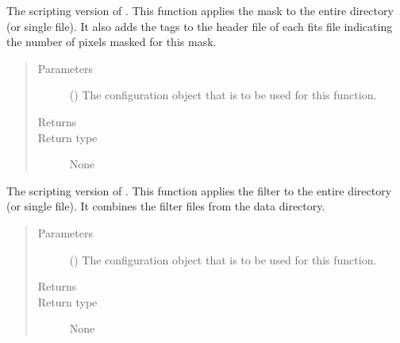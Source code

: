 \documentclass[letterpaper,10pt,english]{sphinxmanual}
\begin{document}
\begin{fulllineitems}
\label{\detokenize{docstrings/ifa_smeargle.masking.scripting:ifa_smeargle.masking.scripting.script_mask_subarray}}
The scripting version of . This function
applies the mask to the entire directory (or single file). It
also adds the tags to the header file of each fits file
indicating the number of pixels masked for this mask.
\begin{quote}\begin{description}
\item[{Parameters}] \leavevmode
{} () \textendash{} The configuration object that is to be used for this
function.

\item[{Returns}] \leavevmode


\item[{Return type}] \leavevmode
None

\end{description}\end{quote}

\end{fulllineitems}


\begin{fulllineitems}
\label{\detokenize{docstrings/ifa_smeargle.masking.scripting:ifa_smeargle.masking.scripting.script_synthesize_filters}}
The scripting version of . This function
applies the filter to the entire directory (or single file). It
combines the filter files from the data directory.
\begin{quote}\begin{description}
\item[{Parameters}] \leavevmode
{} () \textendash{} The configuration object that is to be used for this
function.

\item[{Returns}] \leavevmode


\item[{Return type}] \leavevmode
None

\end{description}\end{quote}

\end{fulllineitems}
\end{document}
